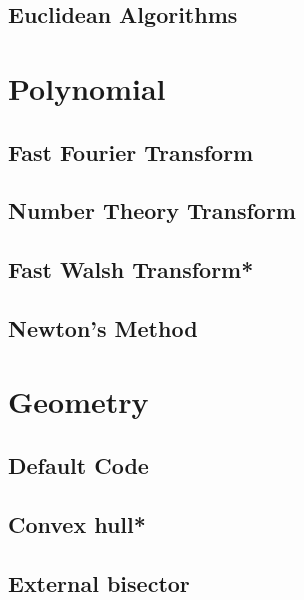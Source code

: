 \subsection{Euclidean Algorithms}


\section{Polynomial}
\subsection{Fast Fourier Transform}

\subsection{Number Theory Transform}

\subsection{Fast Walsh Transform*} %

%
\subsection{Newton's Method}


\section{Geometry}
\subsection{Default Code}

\subsection{Convex hull*} %

\subsection{External bisector}

